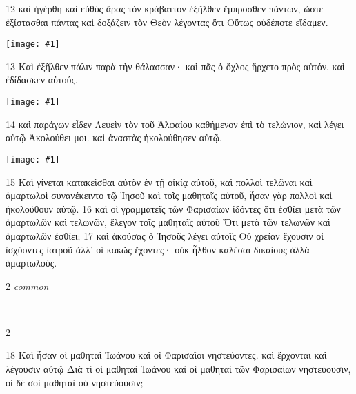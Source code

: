 \documentclass[10pt,a5paper,twoside,twocolumn]{book}
\newcommand{\fig}[1]{\texttt{[image: \#1]}\label{fig:#1}}
\newcommand*\cleartoleftpage{%
  \ifodd\value{page}\hbox{}\clearpage\fi
}
\newcommand{\separator}{\hspace{0.27\textwidth}\noindent\makebox[\linewidth]{\resizebox{0.3333\linewidth}{1pt}{$\bullet$}}\bigskip}
\newenvironment{facing}{\cleartoleftpage}{\clearpage\pagebreak}
\newenvironment{help}{\pagebreak}{}
\newenvironment{helpsec}{\begin{minipage}[t]{\textwidth}\begin{multicols}{2}}{\end{multicols}\end{minipage}}
\newenvironment{vocab}{\begin{helpsec}}{\end{helpsec}}
\newenvironment{translation}{\separator\\\begin{helpsec}\footnotesize}{\end{helpsec}}
\begin{document}

\begin{facing}
 12 καὶ ἠγέρθη καὶ εὐθὺς ἄρας τὸν κράβαττον ἐξῆλθεν ἔμπροσθεν πάντων, ὥστε ἐξίστασθαι πάντας καὶ δοξάζειν τὸν Θεὸν λέγοντας ὅτι Οὕτως οὐδέποτε εἴδαμεν.

\fig{02-13} %

	13 Καὶ ἐξῆλθεν πάλιν παρὰ τὴν θάλασσαν· καὶ πᾶς ὁ ὄχλος ἤρχετο πρὸς αὐτόν, καὶ ἐδίδασκεν αὐτούς. 

\fig{02-14} %

14 καὶ παράγων εἶδεν Λευεὶν τὸν τοῦ Ἀλφαίου καθήμενον ἐπὶ \pagebreak
τὸ τελώνιον, καὶ λέγει αὐτῷ Ἀκολούθει μοι. καὶ ἀναστὰς ἠκολούθησεν αὐτῷ. 

\fig{02-15} %


15 Καὶ γίνεται κατακεῖσθαι αὐτὸν ἐν τῇ οἰκίᾳ αὐτοῦ, καὶ πολλοὶ τελῶναι καὶ ἁμαρτωλοὶ συνανέκειντο τῷ Ἰησοῦ καὶ τοῖς μαθηταῖς αὐτοῦ, ἦσαν γὰρ πολλοὶ καὶ ἠκολούθουν αὐτῷ. 16 καὶ οἱ γραμματεῖς τῶν Φαρισαίων ἰδόντες ὅτι ἐσθίει μετὰ τῶν ἁμαρτωλῶν καὶ τελωνῶν, ἔλεγον τοῖς μαθηταῖς αὐτοῦ Ὅτι μετὰ τῶν τελωνῶν καὶ ἁμαρτωλῶν ἐσθίει; 17 καὶ ἀκούσας ὁ Ἰησοῦς λέγει αὐτοῖς Οὐ χρείαν ἔχουσιν οἱ ἰσχύοντες ἰατροῦ ἀλλ’ οἱ κακῶς ἔχοντες· οὐκ ἦλθον καλέσαι δικαίους ἀλλὰ ἁμαρτωλούς. 


\begin{help}
\begin{vocab}
\emph{common}\\

\end{vocab}
\begin{translation}

\end{translation}
\end{help}
\end{facing}


18 Καὶ ἦσαν οἱ μαθηταὶ Ἰωάνου καὶ οἱ Φαρισαῖοι νηστεύοντες. καὶ ἔρχονται καὶ λέγουσιν αὐτῷ Διὰ τί οἱ μαθηταὶ Ἰωάνου καὶ οἱ μαθηταὶ τῶν Φαρισαίων νηστεύουσιν, οἱ δὲ σοὶ μαθηταὶ οὐ νηστεύουσιν; 
\end{document}
